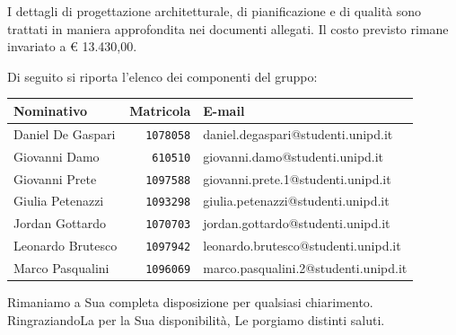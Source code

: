 \documentclass[a4paper,12pt]{letteracdp}
\begin{document}
\begin{letter}
	\noindent 
I dettagli di progettazione architetturale, di pianificazione e di qualità sono trattati in maniera approfondita nei documenti allegati. Il costo previsto rimane invariato a \euro{} 13.430,00.





    \newpage

    \noindent Di seguito si riporta l'elenco dei componenti del gruppo:
    \vspace{0.8cm}
	\begin{center}
		\begin{tabular}{lrl}
			\toprule
			\textbf{Nominativo} & \textbf{Matricola} & \textbf{E-mail} \\
			\midrule
			Daniel De Gaspari 	& \texttt{1078058}	& daniel.degaspari@studenti.unipd.it\\
			Giovanni Damo		& \texttt{610510}	& giovanni.damo@studenti.unipd.it\\
			Giovanni Prete		& \texttt{1097588}	& giovanni.prete.1@studenti.unipd.it \\
			Giulia	Petenazzi	& \texttt{1093298}	& giulia.petenazzi@studenti.unipd.it \\
			Jordan Gottardo		& \texttt{1070703}	& jordan.gottardo@studenti.unipd.it \\
			Leonardo Brutesco	& \texttt{1097942}	& leonardo.brutesco@studenti.unipd.it\\
			Marco Pasqualini	& \texttt{1096069}	&  marco.pasqualini.2@studenti.unipd.it \\
		    \bottomrule
		\end{tabular}
	\end{center}
    \vspace{0.8cm}
	\noindent Rimaniamo a Sua completa disposizione per qualsiasi chiarimento.\\
	RingraziandoLa per la Sua disponibilità, Le porgiamo distinti saluti.
    \closing{\mbox{}}

	\end{letter}
\end{document}
